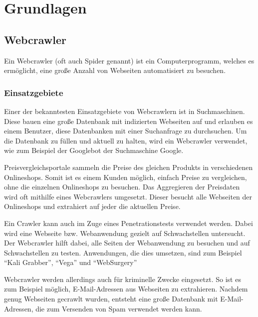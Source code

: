 \chapter{Grundlagen}
\section{Webcrawler}
Ein Webcrawler (oft auch Spider genannt) ist ein Computerprogramm, welches es ermöglicht, eine große Anzahl von Webseiten automatisiert zu besuchen.
\subsection{Einsatzgebiete}
Einer der bekanntesten Einsatzgebiete von Webcrawlern ist in Suchmaschinen. Diese bauen eine große Datenbank mit indizierten Webseiten auf und erlauben es einem Benutzer, diese Datenbanken mit einer Suchanfrage zu durchsuchen. Um die Datenbank zu füllen und aktuell zu halten, wird ein Webcrawler verwendet, wie zum Beispiel der Googlebot der Suchmaschine Google. \cite{Googlebot} 

Preisvergleichsportale sammeln die Preise des gleichen Produkts in verschiedenen Onlineshops. Somit ist es einem Kunden möglich, einfach Preise zu vergleichen, ohne die einzelnen Onlineshops zu besuchen. Das Aggregieren der Preisdaten wird oft mithilfe eines Webcrawlers umgesetzt. Dieser besucht alle Webseiten der Onlineshops und extrahiert auf jeder die aktuellen Preise. \cite{WebshopCrawling} 

Ein Crawler kann auch im Zuge eines Penetrationstests verwendet werden. Dabei wird eine Webseite bzw. Webanwendung gezielt auf Schwachstellen untersucht. Der Webcrawler hilft dabei, alle Seiten der Webanwendung zu besuchen und auf Schwachstellen zu testen. Anwendungen, die dies umsetzen, sind zum Beispiel \enquote{Kali Grabber}\cite{KaliGrabber}, \enquote{Vega}\cite{Vega} und \enquote{WebSurgery}\cite{WebSurgery} 

Webcrawler werden allerdings auch für kriminelle Zwecke eingesetzt. So ist es zum Beispiel möglich, E-Mail-Adressen aus Webseiten zu extrahieren. Nachdem genug Webseiten gecrawlt wurden, entsteht eine große Datenbank mit E-Mail-Adressen, die zum Versenden von Spam verwendet werden kann. \cite{EmailHarvesting} \\

